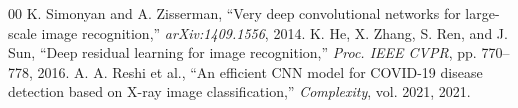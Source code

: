 \documentclass[conference]{IEEEtran}
\begin{document}

\begin{thebibliography}{00}
 K. Simonyan and A. Zisserman, ``Very deep convolutional networks for large-scale image recognition,'' \textit{arXiv:1409.1556}, 2014.
 K. He, X. Zhang, S. Ren, and J. Sun, ``Deep residual learning for image recognition,'' \textit{Proc. IEEE CVPR}, pp. 770--778, 2016.
 A. A. Reshi et al., ``An efficient CNN model for COVID-19 disease detection based on X-ray image classification,'' \textit{Complexity}, vol. 2021, 2021.
\end{thebibliography}
\end{document}
